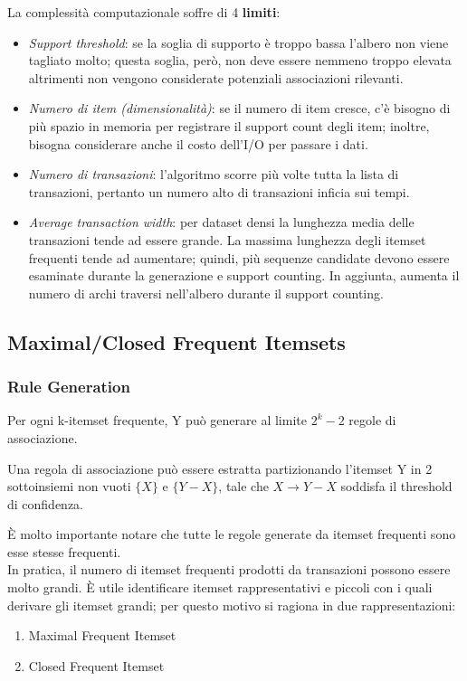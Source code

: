 La complessità computazionale soffre di 4 \textbf{limiti}:
\begin{itemize}
	\item \textit{Support threshold}: se la soglia di supporto è troppo bassa l'albero non viene tagliato molto; questa soglia, però, non deve essere nemmeno troppo elevata altrimenti non vengono considerate potenziali associazioni rilevanti. 
	\item \textit{Numero di item (dimensionalità)}: se il numero di item cresce, c'è bisogno di più spazio in memoria per registrare il support count degli item; inoltre, bisogna considerare anche il costo dell'I/O per passare i dati.
	\item \textit{Numero di transazioni}: l'algoritmo scorre più volte tutta la lista di transazioni, pertanto un numero alto di transazioni inficia sui tempi.
	\item \textit{Average transaction width}: per dataset densi la lunghezza media delle transazioni tende ad essere grande. La massima lunghezza degli itemset frequenti tende ad aumentare; quindi, più sequenze candidate devono essere esaminate durante la generazione e support counting. In aggiunta, aumenta il numero di archi traversi nell'albero durante il support counting.
\end{itemize}

\subsection{Maximal/Closed Frequent Itemsets}
\subsubsection{Rule Generation}
Per ogni k-itemset frequente, Y può generare al limite $2^k-2$ regole di associazione. 

Una regola di associazione può essere estratta partizionando l'itemset Y in 2 sottoinsiemi non vuoti $\{X\}$ e $\{Y-X\}$, tale che $X \rightarrow Y -X$ soddisfa il threshold di confidenza.

\`E molto importante notare che tutte le regole generate da itemset frequenti sono esse stesse frequenti.
\\In pratica, il numero di itemset frequenti prodotti da transazioni possono essere molto grandi. È utile identificare itemset rappresentativi e piccoli con i quali derivare gli itemset grandi; per questo motivo si ragiona in due rappresentazioni:
\begin{enumerate}
	\item Maximal Frequent Itemset
	\item Closed Frequent Itemset
\end{enumerate}

